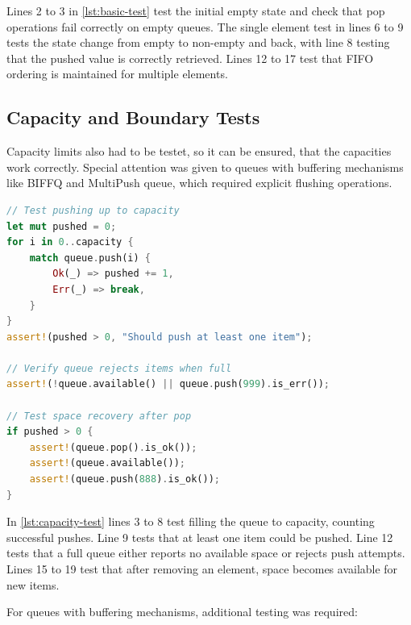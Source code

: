 Lines 2 to 3 in \cref{lst:basic-test} test the initial empty state and check that pop operations fail correctly on empty queues. The single element test in lines 6 to 9 tests the state change from empty to non-empty and back, with line 8 testing that the pushed value is correctly retrieved. Lines 12 to 17 test that FIFO ordering is maintained for multiple elements.

\subsection{Capacity and Boundary Tests}
Capacity limits also had to be testet, so it can be ensured, that the capacities work correctly. Special attention was given to queues with buffering mechanisms like \ac{BIFFQ} and MultiPush queue, which required explicit flushing operations.

\begin{lstlisting}[language=Rust, style=boxed, caption={Capacity limit test pattern}, label={lst:capacity-test}]
// Test pushing up to capacity
let mut pushed = 0;
for i in 0..capacity {
    match queue.push(i) {
        Ok(_) => pushed += 1,
        Err(_) => break,
    }
}
assert!(pushed > 0, "Should push at least one item");

// Verify queue rejects items when full
assert!(!queue.available() || queue.push(999).is_err());

// Test space recovery after pop
if pushed > 0 {
    assert!(queue.pop().is_ok());
    assert!(queue.available());
    assert!(queue.push(888).is_ok());
}
\end{lstlisting}

In \cref{lst:capacity-test} lines 3 to 8 test filling the queue to capacity, counting successful pushes. Line 9 tests that at least one item could be pushed. Line 12 tests that a full queue either reports no available space or rejects push attempts. Lines 15 to 19 test that after removing an element, space becomes available for new items.

For queues with buffering mechanisms, additional testing was required:

